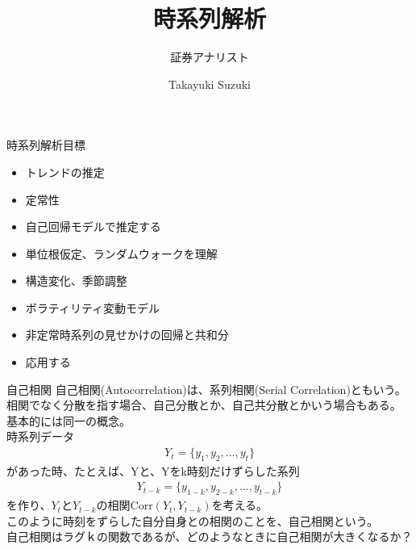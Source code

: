 \documentclass[dvipdfmx,autodetect-engine, unicode, 10pt, aspectratio=169]{beamer}
\title{時系列解析}
\subtitle{証券アナリスト}
\date{}
\author{Takayuki Suzuki}
\institute{This is institude of the author}
\begin{document}
\maketitle


\begin{frame}{時系列解析目標}
    \begin{itemize}
        \item トレンドの推定
        \item 定常性
        \item 自己回帰モデルで推定する
        \item 単位根仮定、ランダムウォークを理解
        \item 構造変化、季節調整
        \item ボラティリティ変動モデル
        \item 非定常時系列の見せかけの回帰と共和分
        \item 応用する
    \end{itemize}
\end{frame}



\begin{frame}{自己相関}
    自己相関(Autocorrelation)は、系列相関(Serial Correlation)ともいう。\\
    相関でなく分散を指す場合、自己分散とか、自己共分散とかいう場合もある。\\
    基本的には同一の概念。\\
    時系列データ
    \begin{align*}
        Y_t =  \{ y_1, y_2, \dotsc , y_t \}
    \end{align*}
    があった時、たとえば、Yと、Yをk時刻だけずらした系列
    \begin{align*}
        Y_{t-k} =  \{ y_{1-k}, y_{2-k}, \dotsc , y_{t-k} \}
    \end{align*}
    を作り、$Y_t$と$Y_{t-k}$の相関$\text{Corr}(Y_t, Y_{t-k})$を考える。\\
    このように時刻をずらした自分自身との相関のことを、自己相関という。\\
    自己相関はラグｋの関数であるが、どのようなときに自己相関が大きくなるか？ 
\end{frame}
\end{document}
